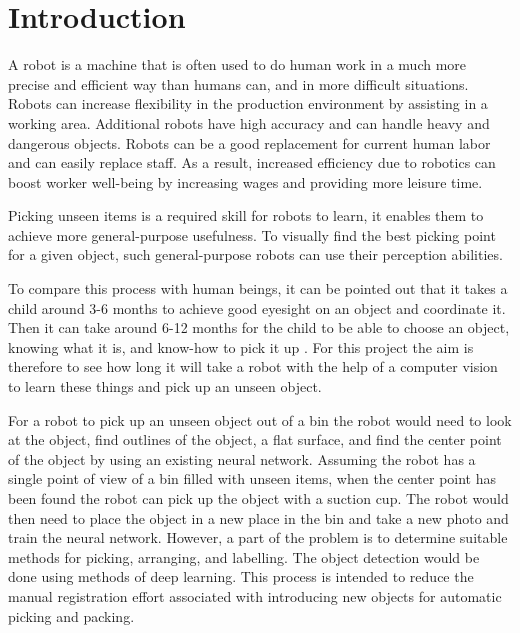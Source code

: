 \chapter{Introduction\label{cha:introduction}}

A robot is a machine that is often used to do human work in a much more precise and efficient way than humans can, and in more difficult situations. Robots can increase flexibility in the production environment by assisting in a working area. Additional robots have high accuracy and can handle heavy and dangerous objects. Robots can be a good replacement for current human labor and can easily replace staff. As a result, increased efficiency due to robotics can boost worker well-being by increasing wages and providing more leisure time.

Picking unseen items is a required skill for robots to learn, it enables them to achieve more general-purpose usefulness. To visually find the best picking point for a given object, such general-purpose robots can use their perception abilities.

To compare this process with human beings, it can be pointed out that it takes a child around 3-6 months to achieve good eyesight on an object and coordinate it. Then it can take around 6-12 months for the child to be able to choose an object, knowing what it is, and know-how to pick it up \cite{zimmermann_visual_2019}. For this project the aim is therefore to see how long it will take a robot with the help of a computer vision to learn these things and pick up an unseen object. 

For a robot to pick up an unseen object out of a bin \cite{xie_unseen_2021} the robot would need to look at the object, find outlines of the object, a flat surface, and find the center point of the object by using an existing neural network. Assuming the robot has a single point of view of a bin filled with unseen items, when the center point has been found the robot can pick up the object with a suction cup. The robot would then need to place the object in a new place in the bin and take a new photo and train the neural network. However, a part of the problem is to determine suitable methods for picking, arranging, and labelling. The object detection would be done using methods of deep learning. This process is intended to reduce the manual registration effort associated with introducing new objects for automatic picking and packing.


